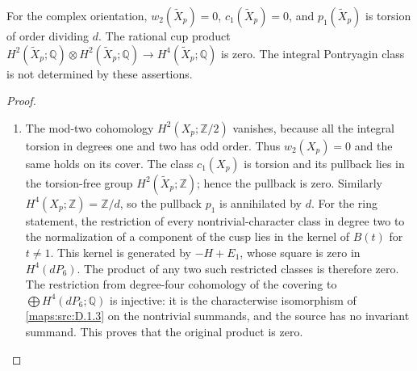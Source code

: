 \begin{proposition}\label{maps:src:D.1.5}


For the complex orientation, $w_2(\widetilde X_p)=0$,
$c_1(\widetilde X_p)=0$, and $p_1(\widetilde X_p)$ is torsion of
order dividing $d$. The rational cup product
$H^2(\widetilde X_p;\mathbb Q)\otimes H^2(\widetilde X_p;\mathbb Q)
\to H^4(\widetilde X_p;\mathbb Q)$ is zero. The integral Pontryagin
class is not determined by these assertions.
\end{proposition}


\begin{proof}
\begin{enumerate}[label=\arabic*.,leftmargin=*]
\item The mod-two cohomology $H^2(X_p;\mathbb Z/2)$ vanishes, because all
the integral torsion in degrees one and two has odd order. Thus
$w_2(X_p)=0$ and the same holds on its cover. The class $c_1(X_p)$
is torsion and its pullback lies in the torsion-free group
$H^2(\widetilde X_p;\mathbb Z)$; hence the pullback is zero.
Similarly $H^4(X_p;\mathbb Z)=\mathbb Z/d$, so the pullback $p_1$
is annihilated by $d$.
For the ring statement, the restriction of every nontrivial-character
class in degree two to the normalization of a component of the cusp
lies in the kernel of $B(t)$ for $t\ne1$. This kernel is generated
by $-H+E_1$, whose square is zero in $H^4(dP_6)$.
The product of any two such restricted classes is therefore zero.
The restriction from degree-four cohomology of the covering to
$\bigoplus H^4(dP_6;\mathbb Q)$ is injective: it is the characterwise
isomorphism of \ref{maps:src:D.1.3} on the nontrivial summands, and the source has
no invariant summand. This proves that the original product is zero.
\end{enumerate}
\end{proof}

